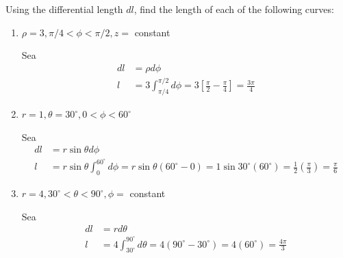 \begin{problema}
    Using the differential length $d l$, find the length of each of the following curves:

    \begin{enumerate}
        \item $\rho=3, \pi / 4<\phi<\pi / 2, z=$ constant
        \begin{sol}
            Sea 
            \begin{align*}
                dl &= \rho d\phi\\
                l & = 3\int_{\pi/4}^{\pi/2}d\phi = 3\left[\frac{\pi}{2}-\frac{\pi}{4}\right]=\frac{3\pi}{4}
            \end{align*}
        \end{sol}

        \item $r=1, \theta=30^{\circ}, 0<\phi<60^{\circ}$
        \begin{sol}
            Sea
            \begin{align*}
                dl &= r\sin\theta d\phi\\
                l &= r\sin\theta \int_0^{60^\circ}d\phi = r\sin\theta(60^\circ - 0)=1\sin 30^\circ(60^\circ)=
                \frac{1}{2}\left(\frac{\pi}{3}\right)=\frac{\pi}{6}
            \end{align*}
        \end{sol}
        
        \item $r=4,30^{\circ}<\theta<90^{\circ}, \phi=$ constant
        \begin{sol}
            Sea 
            \begin{align*}
                dl &= rd\theta\\
                l &= 4\int_{30^\circ}^{90^\circ}d\theta=4(90^\circ -30^\circ)=4(60^\circ)= \frac{4\pi}{3}
            \end{align*}
        \end{sol}
    \end{enumerate}

        \end{problema}



